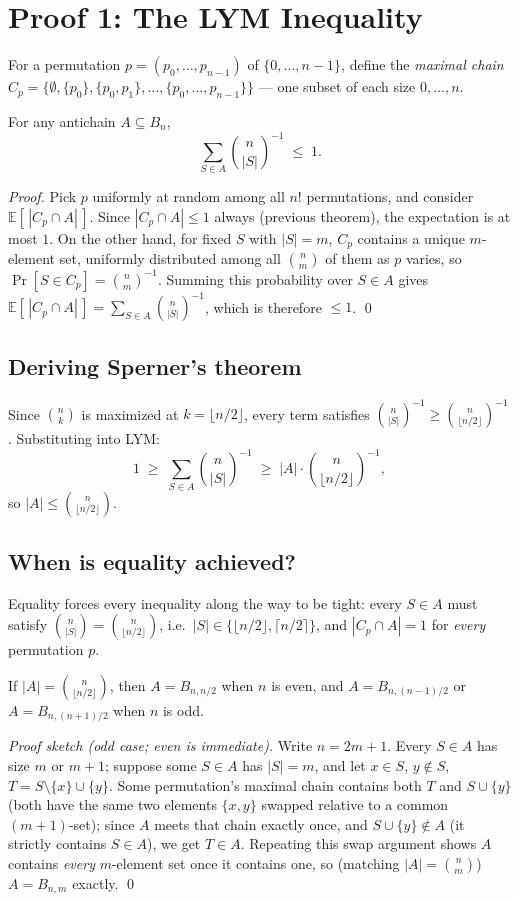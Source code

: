 \documentclass[11pt]{article}
\begin{document}
\section{Proof 1: The LYM Inequality}
For a permutation $p = (p_0, \ldots, p_{n-1})$ of $\{0,\ldots,n-1\}$,
define the \emph{maximal chain}
$C_p = \{\emptyset, \{p_0\}, \{p_0,p_1\}, \ldots, \{p_0,\ldots,p_{n-1}\}\}$
--- one subset of each size $0,\ldots,n$.

\begin{theorembox}
For any antichain $A \subseteq B_n$,
\[
  \sum_{S \in A} \binom{n}{|S|}^{-1} \;\le\; 1.
\]

\emph{Proof.} Pick $p$ uniformly at random among all $n!$ permutations,
and consider $\mathbb{E}[\,|C_p \cap A|\,]$. Since $|C_p \cap A| \le 1$
always (previous theorem), the expectation is at most $1$. On the other
hand, for fixed $S$ with $|S|=m$, $C_p$ contains a unique $m$-element set,
uniformly distributed among all $\binom{n}{m}$ of them as $p$ varies, so
$\Pr[S \in C_p] = \binom{n}{m}^{-1}$. Summing this probability over
$S \in A$ gives $\mathbb{E}[\,|C_p \cap A|\,] = \sum_{S \in A}
\binom{n}{|S|}^{-1}$, which is therefore $\le 1$. \qed
\end{theorembox}

\subsection{Deriving Sperner's theorem}
Since $\binom{n}{k}$ is maximized at $k = \lfloor n/2 \rfloor$, every term
satisfies $\binom{n}{|S|}^{-1} \ge \binom{n}{\lfloor n/2\rfloor}^{-1}$.
Substituting into LYM:
\[
  1 \;\ge\; \sum_{S \in A} \binom{n}{|S|}^{-1}
  \;\ge\; |A| \cdot \binom{n}{\lfloor n/2 \rfloor}^{-1},
\]
so $|A| \le \binom{n}{\lfloor n/2 \rfloor}$.

\subsection{When is equality achieved?}
Equality forces every inequality along the way to be tight: every $S \in
A$ must satisfy $\binom{n}{|S|} = \binom{n}{\lfloor n/2\rfloor}$, i.e.\
$|S| \in \{\lfloor n/2\rfloor, \lceil n/2\rceil\}$, and $|C_p \cap A|=1$
for \emph{every} permutation $p$.

\begin{theorembox}
If $|A| = \binom{n}{\lfloor n/2\rfloor}$, then $A = B_{n,n/2}$ when $n$ is
even, and $A = B_{n,(n-1)/2}$ or $A = B_{n,(n+1)/2}$ when $n$ is odd.

\emph{Proof sketch (odd case; even is immediate).} Write $n=2m+1$. Every
$S \in A$ has size $m$ or $m+1$; suppose some $S \in A$ has $|S|=m$, and
let $x \in S$, $y \notin S$, $T = S \setminus\{x\} \cup \{y\}$. Some
permutation's maximal chain contains both $T$ and $S \cup \{y\}$ (both
have the same two elements $\{x,y\}$ swapped relative to a common
$(m{+}1)$-set); since $A$ meets that chain exactly once, and
$S\cup\{y\} \notin A$ (it strictly contains $S \in A$), we get $T \in A$.
Repeating this swap argument shows $A$ contains \emph{every} $m$-element
set once it contains one, so (matching $|A|=\binom{n}{m}$) $A = B_{n,m}$
exactly. \qed
\end{theorembox}
\end{document}
